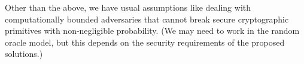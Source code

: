 Other than the above, we have usual assumptions like dealing with 
computationally bounded adversaries 
that cannot break secure cryptographic primitives with non-negligible probability. 
(We may need to work in the random oracle model, but this depends on the 
security requirements of the proposed solutions.)



